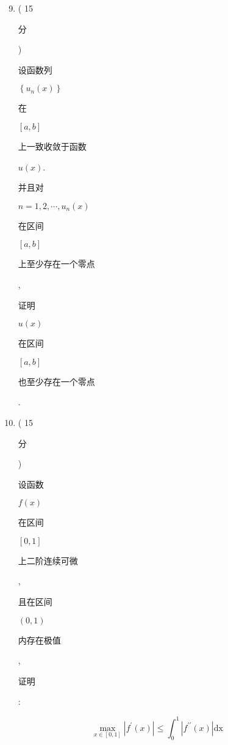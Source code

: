 \documentclass[10pt]{article}
\begin{document}
\begin{enumerate}
  \setcounter{enumi}{8}
  \item ( 15 \begin{CJK}{UTF8}{mj}分\end{CJK}) \begin{CJK}{UTF8}{mj}设函数列\end{CJK} $\left\{u_{n}(x)\right\}$ \begin{CJK}{UTF8}{mj}在\end{CJK} $[a, b]$ \begin{CJK}{UTF8}{mj}上一致收敛于函数\end{CJK} $u(x)$. \begin{CJK}{UTF8}{mj}并且对\end{CJK} $n=1,2, \cdots, u_{n}(x)$ \begin{CJK}{UTF8}{mj}在区间\end{CJK} $[a, b]$ \begin{CJK}{UTF8}{mj}上至少存在一个零点\end{CJK}, \begin{CJK}{UTF8}{mj}证明\end{CJK} $u(x)$ \begin{CJK}{UTF8}{mj}在区间\end{CJK} $[a, b]$ \begin{CJK}{UTF8}{mj}也至少存在一个零点\end{CJK}.

  \item ( 15 \begin{CJK}{UTF8}{mj}分\end{CJK}) \begin{CJK}{UTF8}{mj}设函数\end{CJK} $f(x)$ \begin{CJK}{UTF8}{mj}在区间\end{CJK} $[0,1]$ \begin{CJK}{UTF8}{mj}上二阶连续可微\end{CJK}, \begin{CJK}{UTF8}{mj}且在区间\end{CJK} $(0,1)$ \begin{CJK}{UTF8}{mj}内存在极值\end{CJK}, \begin{CJK}{UTF8}{mj}证明\end{CJK}:

\end{enumerate}
$$
\max _{x \in[0,1]}\left|f^{\prime}(x)\right| \leq \int_{0}^{1}\left|f^{\prime \prime}(x)\right| \mathrm{dx}
$$
\end{document}
